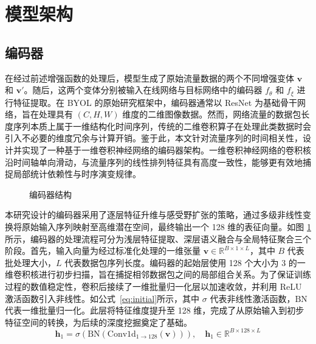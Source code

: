 \section{模型架构}
\subsection{编码器}
在经过前述增强函数的处理后，模型生成了原始流量数据的两个不同增强变体 $\mathbf{v}$ 和 $\mathbf{v}'$。随后，这两个变体分别被输入在线网络与目标网络中的编码器 $f_\theta$ 和 $f_\xi$ 进行特征提取。在 BYOL 的原始研究框架中，编码器通常以 ResNet 为基础骨干网络，旨在处理具有 $(C, H, W)$ 维度的二维图像数据。然而，网络流量的数据包长度序列本质上属于一维结构化时间序列，传统的二维卷积算子在处理此类数据时会引入不必要的维度冗余与计算开销。鉴于此，本文针对流量序列的时间相关性，设计并实现了一种基于一维卷积神经网络的编码器架构。一维卷积神经网络的卷积核沿时间轴单向滑动，与流量序列的线性排列特征具有高度一致性，能够更有效地捕捉局部统计依赖性与时序演变规律。
\begin{figure}[ht]
  \centering
  \caption{编码器结构}
  \label{fig:encoder}
\end{figure}

本研究设计的编码器采用了逐层特征升维与感受野扩张的策略，通过多级非线性变换将原始输入序列映射至高维潜在空间，最终输出一个 128 维的表征向量。如图 \ref{fig:encoder} 所示，编码器的处理流程可分为浅层特征提取、深层语义融合与全局特征聚合三个阶段。首先，输入向量为经过标准化处理的一维张量 $\mathbf{v} \in \mathbb{R}^{B \times 1 \times L}$，其中 $B$ 代表批处理大小，$L$ 代表数据包序列长度。编码器的起始层使用 128 个大小为 3 的一维卷积核进行初步扫描，旨在捕捉相邻数据包之间的局部组合关系。为了保证训练过程的数值稳定性，卷积后接续了一维批量归一化层以加速收敛，并利用 ReLU 激活函数引入非线性。如公式~\ref{eq:initial}所示，其中 $\sigma$ 代表非线性激活函数，$\text{BN}$ 代表一维批量归一化。此层将特征维度提升至 128 维，完成了从原始输入到初步特征空间的转换，为后续的深度挖掘奠定了基础。
\begin{equation}
  \mathbf{h}_1 = \sigma(\text{BN}(\text{Conv1d}_{1 \to 128}(\mathbf{v}))), \quad \mathbf{h}_1 \in \mathbb{R}^{B \times 128 \times L}
  \label{eq:initial}
\end{equation}

